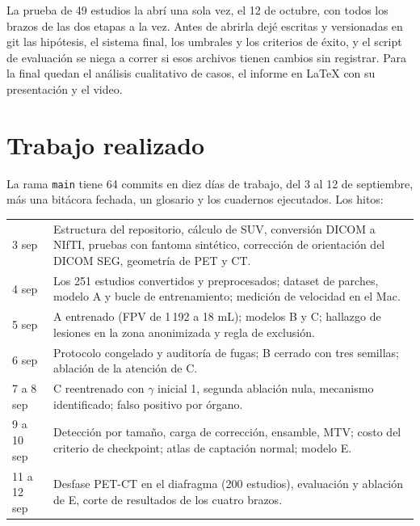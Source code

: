 \documentclass[11pt,a4paper]{article}
\begin{document}
La prueba de 49 estudios la abrí una sola vez, el 12 de octubre, con todos los brazos de las dos etapas a la vez. Antes de abrirla dejé escritas y versionadas en git las hipótesis, el sistema final, los umbrales y los criterios de éxito, y el script de evaluación se niega a correr si esos archivos tienen cambios sin registrar. Para la final quedan el análisis cualitativo de casos, el informe en LaTeX con su presentación y el video.

\section{Trabajo realizado}

La rama \texttt{main} tiene 64 commits en diez días de trabajo, del 3 al 12 de septiembre, más una bitácora fechada, un glosario y los cuadernos ejecutados. Los hitos:

{\small
\begin{tabular}{@{}p{1.6cm}p{14.6cm}@{}}
\toprule
3 sep & Estructura del repositorio, cálculo de SUV, conversión DICOM a NIfTI, pruebas con fantoma sintético, corrección de orientación del DICOM SEG, geometría de PET y CT. \\
4 sep & Los 251 estudios convertidos y preprocesados; dataset de parches, modelo A y bucle de entrenamiento; medición de velocidad en el Mac. \\
5 sep & A entrenado (FPV de 1\,192 a 18 mL); modelos B y C; hallazgo de lesiones en la zona anonimizada y regla de exclusión. \\
6 sep & Protocolo congelado y auditoría de fugas; B cerrado con tres semillas; ablación de la atención de C. \\
7 a 8 sep & C reentrenado con $\gamma$ inicial 1, segunda ablación nula, mecanismo identificado; falso positivo por órgano. \\
9 a 10 sep & Detección por tamaño, carga de corrección, ensamble, MTV; costo del criterio de checkpoint; atlas de captación normal; modelo E. \\
11 a 12 sep & Desfase PET-CT en el diafragma (200 estudios), evaluación y ablación de E, corte de resultados de los cuatro brazos. \\
\bottomrule
\end{tabular}}
\end{document}
